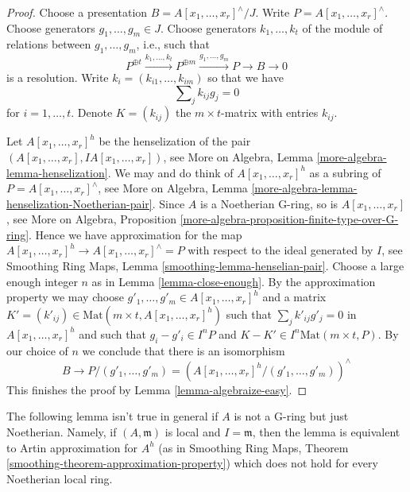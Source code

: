 \begin{proof}
Choose a presentation $B = A[x_1, \ldots, x_r]^\wedge/J$. Write
$P = A[x_1, \ldots, x_r]^\wedge$. Choose generators $g_1, \ldots, g_m \in J$.
Choose generators $k_1, \ldots, k_t$ of the module
of relations between $g_1, \ldots, g_m$, i.e., such that
$$
P^{\oplus t} \xrightarrow{k_1, \ldots, k_t}
P^{\oplus m} \xrightarrow{g_1, \ldots, g_m}
P \to B \to 0
$$
is a resolution. Write $k_i = (k_{i1}, \ldots, k_{im})$ so that we have
\begin{equation}
\label{equation-relations-straight-up}
\sum\nolimits_j k_{ij}g_j = 0
\end{equation}
for $i = 1, \ldots, t$. Denote $K = (k_{ij})$ the $m \times t$-matrix
with entries $k_{ij}$.

\medskip\noindent
Let $A[x_1, \ldots, x_r]^h$ be the henselization of the
pair $(A[x_1, \ldots, x_r], IA[x_1, \ldots, x_r])$, see
More on Algebra, Lemma \ref{more-algebra-lemma-henselization}.
We may and do think of $A[x_1, \ldots, x_r]^h$ as a subring
of $P = A[x_1, \ldots, x_r]^\wedge$, see
More on Algebra, Lemma
\ref{more-algebra-lemma-henselization-Noetherian-pair}.
Since $A$ is a Noetherian G-ring, so is $A[x_1, \ldots, x_r]$, see
More on Algebra, Proposition
\ref{more-algebra-proposition-finite-type-over-G-ring}.
Hence we have approximation for the map
$A[x_1, \ldots, x_r]^h \to A[x_1, \ldots, x_r]^\wedge = P$
with respect to the ideal generated by $I$, see
Smoothing Ring Maps, Lemma \ref{smoothing-lemma-henselian-pair}.
Choose a large enough integer $n$ as in Lemma \ref{lemma-close-enough}.
By the approximation property we may choose
$g'_1, \ldots, g'_m \in A[x_1, \ldots, x_r]^h$
and a matrix
$K' = (k'_{ij}) \in \text{Mat}(m \times t, A[x_1, \ldots, x_r]^h)$
such that $\sum\nolimits_j k'_{ij}g'_j = 0$ in
$A[x_1, \ldots, x_r]^h$ and such that
$g_i - g'_i \in I^nP$ and $K - K' \in I^n\text{Mat}(m \times t, P)$.
By our choice of $n$ we conclude that there is an isomorphism
$$
B \to P/(g'_1, \ldots, g'_m) =
\left(A[x_1, \ldots, x_r]^h/(g'_1, \ldots, g'_m)\right)^\wedge
$$
This finishes the proof by Lemma \ref{lemma-algebraize-easy}.
\end{proof}

\noindent
The following lemma isn't true in general if $A$ is not a G-ring
but just Noetherian. Namely, if $(A, \mathfrak m)$ is local
and $I = \mathfrak m$, then the lemma is equivalent to 
Artin approximation for $A^h$ (as in
Smoothing Ring Maps, Theorem \ref{smoothing-theorem-approximation-property})
which does not hold for every Noetherian local ring.

